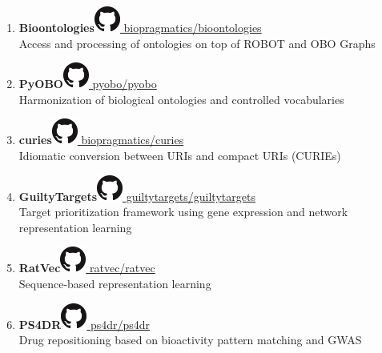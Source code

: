 \documentclass[10pt,a4paper,sans]{moderncv} %
\begin{document}
\begin{enumerate}
        \item \textbf{Bioontologies}\hfill\href{https://github.com/biopragmatics/bioontologies}{\includegraphics[scale=0.25]{img/GitHub-Mark-32px} biopragmatics/bioontologies}
\\
    Access and processing of ontologies on top of ROBOT and OBO Graphs

        \item \textbf{PyOBO}\hfill\href{https://github.com/pyobo/pyobo}{\includegraphics[scale=0.25]{img/GitHub-Mark-32px} pyobo/pyobo}
\\
    Harmonization of biological ontologies and controlled vocabularies

        \item \textbf{curies}\hfill\href{https://github.com/biopragmatics/curies}{\includegraphics[scale=0.25]{img/GitHub-Mark-32px} biopragmatics/curies}
\\
    Idiomatic conversion between URIs and compact URIs (CURIEs)

        \item \textbf{GuiltyTargets}\hfill\href{https://github.com/guiltytargets/guiltytargets}{\includegraphics[scale=0.25]{img/GitHub-Mark-32px} guiltytargets/guiltytargets}
\\
    Target prioritization framework using gene expression and network representation learning

        \item \textbf{RatVec}\hfill\href{https://github.com/ratvec/ratvec}{\includegraphics[scale=0.25]{img/GitHub-Mark-32px} ratvec/ratvec}
\\
    Sequence-based representation learning

        \item \textbf{PS4DR}\hfill\href{https://github.com/ps4dr/ps4dr}{\includegraphics[scale=0.25]{img/GitHub-Mark-32px} ps4dr/ps4dr}
\\
    Drug repositioning based on bioactivity pattern matching and GWAS


\end{enumerate}
\end{document}
